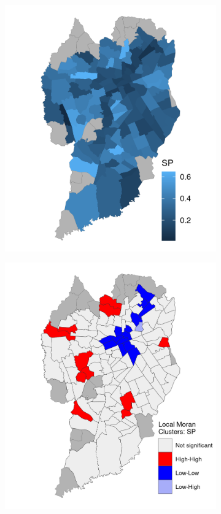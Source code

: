\begin{figure}[!htbp]
    \centering\footnotesize
    \captionsetup{font=footnotesize}
    \caption{SPEEDING PER TAZ}
    \begin{subfigure}{0.5\textwidth}
        \includegraphics{fig/map_SP.png}
    \end{subfigure}%
    \begin{subfigure}{0.5\textwidth}
        \includegraphics{fig/lisa_SP.png}

\end{subfigure}
\end{figure}
